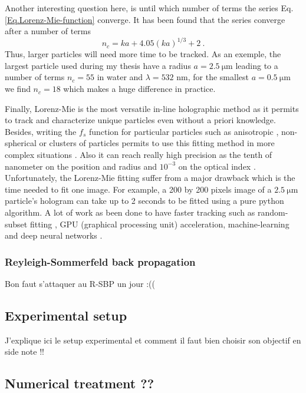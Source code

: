  Another interesting question here, is until which number of terms the series Eq.\ref{Eq.Lorenz-Mie-function} converge. It has been found \cite{lentz_generating_1976} that the series converge after a number of terms
\begin{equation}
	n_c = k a + 4.05 (k a)^{1/3} + 2 ~.
\end{equation}
Thus, larger particles will need more time to be tracked. As an exemple, the largest particle used during my thesis have a radius $a = 2.5 ~ \mathrm{\mu m}$ leading to a number of terms $ n_c = 55$ in water and $\lambda = 532$ nm, for the smallest $a = 0.5 ~ \mathrm{\mu m}$ we find $n_c = 18$ which makes a huge difference in practice.

Finally, Lorenz-Mie is the most versatile in-line holographic method as it permits to track and characterize unique particles even without a priori knowledge. Besides, writing the $f_s$ function for particular particles such as anisotropic \cite{fung_holographic_2013}, non-spherical \cite{wang_using_2014} or clusters \cite{fung_holographic_2013, perry_real-space_2013} of particles permits to use this fitting method in more complex situations . Also it can reach really high precision as the tenth of nanometer on the position and radius and $10^{-3}$ on the optical index \cite{lee_characterizing_2007}. Unfortunately, the Lorenz-Mie fitting suffer from a major drawback which is the time needed to fit one image. For example, a 200 by 200 pixels image of a $2.5 ~ \mathrm{\mu m}$ particle's hologram can take up to 2 seconds to be fitted using a pure python algorithm. A lot of work as been done to have faster tracking such as random-subset fitting \cite{dimiduk_random-subset_2014}, GPU (graphical processing unit) acceleration, machine-learning \cite{yevick_machine-learning_2014, hannel_machine-learning_2018} and deep neural networks \cite{altman_catch_2020}.

\subsubsection{Reyleigh-Sommerfeld back propagation}
Bon faut s'attaquer au R-SBP un jour :((

\subsection{Experimental setup}
J'explique ici le setup experimental et comment il faut bien choisir son objectif en side note !!

\subsection{Numerical treatment ??}

